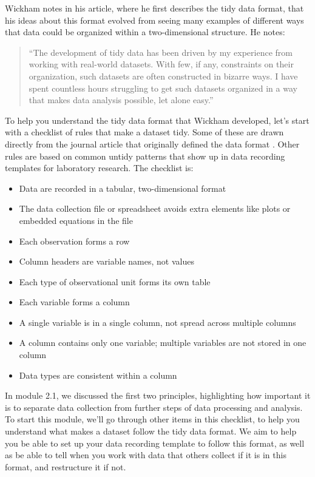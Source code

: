 \documentclass[]{tufte-book}
\providecommand{\tightlist}{%
  \setlength{\itemsep}{0pt}\setlength{\parskip}{0pt}}
\begin{document}
Wickham notes in his article, where he first describes the tidy data format,
that his ideas about this format evolved from seeing many examples of
different ways that data could be organized within a two-dimensional structure.
He notes:

\begin{quote}
``The development of tidy data has been driven by my experience from working
with real-world datasets. With few, if any, constraints on their organization,
such datasets are often constructed in bizarre ways. I have spent countless
hours struggling to get such datasets organized in a way that makes data
analysis possible, let alone easy.'' \citep{wickham2014tidy}
\end{quote}

To help you understand the tidy data format that Wickham developed, let's start
with a checklist of rules that make a dataset tidy. Some of these are drawn
directly from the journal article that originally defined the data format
\citep{wickham2014tidy}. Other rules are based on common untidy patterns that show
up in data recording templates for laboratory research. The checklist is:

\begin{itemize}
\tightlist
\item
  Data are recorded in a tabular, two-dimensional format
\item
  The data collection file or spreadsheet avoids extra elements
  like plots or embedded equations in the file
\item
  Each observation forms a row
\item
  Column headers are variable names, not values
\item
  Each type of observational unit forms its own table
\item
  Each variable forms a column
\item
  A single variable is in a single column, not spread across multiple columns
\item
  A column contains only one variable; multiple variables are not stored in one column
\item
  Data types are consistent within a column
\end{itemize}

In module 2.1, we discussed the first two principles, highlighting how
important it is to separate data collection from further steps of data
processing and analysis. To start this module, we'll go through other
items in this checklist, to help you understand what makes a dataset follow the
tidy data format. We aim to help you be able to set up your data recording template
to follow this format, as well as be able to tell when you work with data that
others collect if it is in this format, and restructure it if not.
\end{document}
